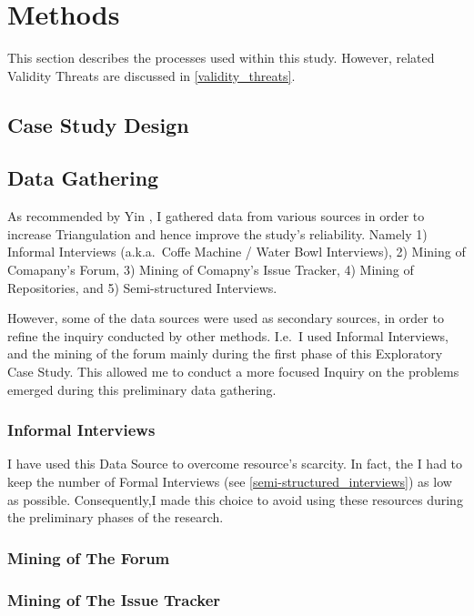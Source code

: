 \chapter{Methods} \label{methods}
This section describes the processes used within this study. However, related Validity Threats are discussed in \ref{validity_threats}.

\section{Case Study Design}

\section{Data Gathering}
As recommended by Yin \cite{case_study_guide}, I gathered data from various sources in order to increase Triangulation and hence improve the study's reliability. Namely 1) Informal Interviews (a.k.a.\ Coffe Machine / Water Bowl Interviews), 2) Mining of Comapany's Forum, 3) Mining of Comapny's Issue Tracker, 4) Mining of Repositories, and 5) Semi-structured Interviews.

However, some of the data sources were used as secondary sources, in order to refine the inquiry conducted by other methods. I.e.\ I used Informal Interviews, and the mining of the forum mainly during the first phase of this Exploratory Case Study. This allowed me to conduct a more focused Inquiry on the problems emerged during this preliminary data gathering.

\subsection{Informal Interviews}
I have used this Data Source to overcome resource's scarcity. In fact, the I had to keep the number of Formal Interviews (see \ref{semi-structured_interviews}) as low as possible. Consequently,I made this choice to avoid using these resources during the preliminary phases of the research. 



\subsection{Mining of The Forum}

\subsection{Mining of The Issue Tracker}

